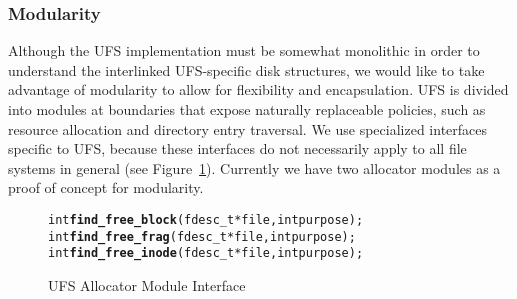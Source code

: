 \subsubsection {Modularity}
Although the UFS implementation must be somewhat monolithic in order to
understand the interlinked UFS-specific disk structures, we would like to take
advantage of modularity to allow for flexibility and encapsulation. UFS is
divided into modules at boundaries that expose naturally replaceable policies,
such as resource allocation and directory entry traversal. We use specialized
interfaces specific to UFS, because these interfaces do not necessarily apply
to all file systems in general (see Figure~\ref{fig:moduleinterface}).
Currently we have two allocator modules as a proof of concept for modularity.

\begin{figure}[htb]
\vspace{-0.5\baselineskip}
\begin{scriptsize}
\begin{alltt}
int \textbf{find_free_block}(fdesc_t * file, int purpose);
int \textbf{find_free_frag}(fdesc_t * file, int purpose);
int \textbf{find_free_inode}(fdesc_t * file, int purpose);
\end{alltt}
\end{scriptsize}
\vspace{-0.5\baselineskip}
\caption{\label{fig:moduleinterface} UFS Allocator Module Interface}
\end{figure}


